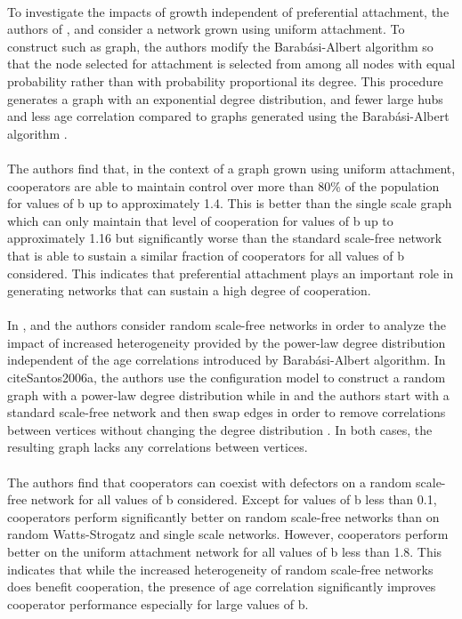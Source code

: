 \documentclass{article}
\begin{document}
	\paragraph{}To investigate the impacts of growth independent of preferential attachment, the authors of  \cite{Pacheco2005}, \cite{Santos2006a} and \cite{Santos2005b} consider a network grown using uniform attachment.  To construct such as graph, the authors modify the Barabási-Albert algorithm so that the node selected for attachment is selected from among all nodes with equal probability rather than with probability proportional its degree.  This procedure generates a graph with an exponential degree distribution, and fewer large hubs and less age correlation compared to graphs generated using the Barabási-Albert algorithm \cite{Santos2006a}.
	\paragraph{}The authors find that, in the context of a graph grown using uniform attachment, cooperators are able to maintain control over more than 80\% of the population for values of b up to approximately 1.4.  This is better than the single scale graph which can only maintain that level of cooperation for values of b up to approximately 1.16 but significantly worse than the standard scale-free network that is able to sustain a similar fraction of cooperators for all values of b considered.  This indicates that preferential attachment plays an important role in generating networks that can sustain a high degree of cooperation.
	\paragraph{}In \cite{Santos2006a}, \cite{Santos2006b} and \cite{Santos2006c} the authors consider random scale-free networks in order to analyze the impact of increased heterogeneity provided by the power-law degree distribution independent of the age correlations introduced by Barabási-Albert algorithm.  In cite{Santos2006a}, the authors use the configuration model \cite{Molloy1995} to construct a random graph with a power-law degree distribution while in \cite{Santos2006b} and \cite{Santos2006c} the authors start with a standard scale-free network and then swap edges in order to remove correlations between vertices without changing the degree distribution \cite{Maslov2002}.  In both cases, the resulting graph lacks any correlations between vertices.
	\paragraph{}The authors find that cooperators can coexist with defectors on a random scale-free network for all values of b considered.  Except for values of b less than 0.1, cooperators perform significantly better on random scale-free networks than on random Watts-Strogatz and single scale networks.  However, cooperators perform better on the uniform attachment network for all values of b less than 1.8.  This indicates that while the increased heterogeneity of random scale-free networks does benefit cooperation, the presence of age correlation significantly improves cooperator performance especially for large values of b.
\end{document}
